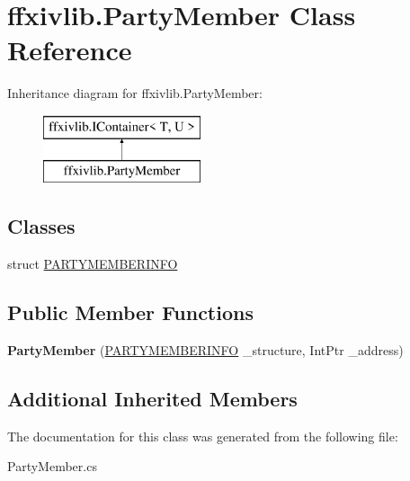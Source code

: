 \hypertarget{classffxivlib_1_1_party_member}{\section{ffxivlib.\-Party\-Member Class Reference}
\label{classffxivlib_1_1_party_member}
}
Inheritance diagram for ffxivlib.\-Party\-Member\-:\begin{figure}[H]
\begin{center}
\leavevmode
\includegraphics[height=2.000000cm]{classffxivlib_1_1_party_member}
\end{center}
\end{figure}
\subsection*{Classes}
\begin{DoxyCompactItemize}
\item 
struct \hyperlink{structffxivlib_1_1_party_member_1_1_p_a_r_t_y_m_e_m_b_e_r_i_n_f_o}{P\-A\-R\-T\-Y\-M\-E\-M\-B\-E\-R\-I\-N\-F\-O}
\end{DoxyCompactItemize}
\subsection*{Public Member Functions}
\begin{DoxyCompactItemize}
\item 
\hypertarget{classffxivlib_1_1_party_member_adc4a8b102bf341ca1dce3a2a7f92fa28}{{\bfseries Party\-Member} (\hyperlink{structffxivlib_1_1_party_member_1_1_p_a_r_t_y_m_e_m_b_e_r_i_n_f_o}{P\-A\-R\-T\-Y\-M\-E\-M\-B\-E\-R\-I\-N\-F\-O} \-\_\-structure, Int\-Ptr \-\_\-address)}\label{classffxivlib_1_1_party_member_adc4a8b102bf341ca1dce3a2a7f92fa28}

\end{DoxyCompactItemize}
\subsection*{Additional Inherited Members}


The documentation for this class was generated from the following file\-:\begin{DoxyCompactItemize}
\item 
Party\-Member.\-cs\end{DoxyCompactItemize}
